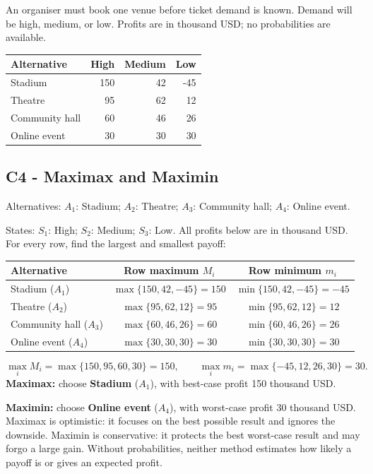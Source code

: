 \clearpage
{}
An organiser must book one venue before ticket demand is known. Demand will be high, medium, or low. Profits are in thousand USD; no probabilities are available.
\begin{center}\small\setlength{\tabcolsep}{4pt}
\begin{tabular}{@{}lrrr@{}}\toprule
Alternative&High&Medium&Low\\\midrule
Stadium&150&42&-45\\
Theatre&95&62&12\\
Community hall&60&46&26\\
Online event&30&30&30\\\bottomrule
\end{tabular}\end{center}
\subsection*{C4 - Maximax and Maximin }
\label{sol:concert-venue-c4}
Alternatives: $A_1$: Stadium; $A_2$: Theatre; $A_3$: Community hall; $A_4$: Online event.\par
States: $S_1$: High; $S_2$: Medium; $S_3$: Low.
All profits below are in thousand USD. For every row, find the largest and smallest payoff:
\begin{center}
\begin{tabular}{@{}lcc@{}}\toprule
Alternative & Row maximum $M_i$ & Row minimum $m_i$\\\midrule
Stadium ($A_1$) & $\max\{150,42,-45\}=150$ & $\min\{150,42,-45\}=-45$\\
Theatre ($A_2$) & $\max\{95,62,12\}=95$ & $\min\{95,62,12\}=12$\\
Community hall ($A_3$) & $\max\{60,46,26\}=60$ & $\min\{60,46,26\}=26$\\
Online event ($A_4$) & $\max\{30,30,30\}=30$ & $\min\{30,30,30\}=30$\\
\bottomrule\end{tabular}
\end{center}
\[\max_i M_i=\max\{150,95,60,30\}=150,\qquad \max_i m_i=\max\{-45,12,26,30\}=30.\]
\textbf{Maximax:} choose \textbf{Stadium} ($A_1$), with best-case profit 150 thousand USD.\par
\textbf{Maximin:} choose \textbf{Online event} ($A_4$), with worst-case profit 30 thousand USD.
Maximax is optimistic: it focuses on the best possible result and ignores the downside. Maximin is conservative: it protects the best worst-case result and may forgo a large gain. Without probabilities, neither method estimates how likely a payoff is or gives an expected profit.

